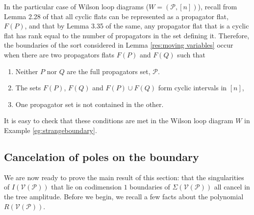 \documentclass[11pt]{article}
\newcommand{\drawWLD}[2]{

\pgfmathsetmacro{\n}{#1}
\pgfmathsetmacro{\radius}{#2}
\pgfmathsetmacro{\angle}{360/\n}
\draw (0,0) circle (\radius);
    \foreach \i in {1,2,...,\n} {
      \draw (\angle*\i:\radius) node {$\bullet$};
    }

}
\newcommand{\drawprop}[4]{
\pgfmathsetmacro{\r}{#1}
\pgfmathsetmacro{\bumpr}{#2}
\pgfmathsetmacro{\s}{#3}
\pgfmathsetmacro{\bumps}{#4}
\pgfmathsetmacro{\perturbe}{\angle/\n}
\begin{scope}
\draw[smallpropagator] (\angle*\r + \angle/2 + \bumpr*\perturbe:\radius) -- (\angle*\s + \angle/2 + \bumps*\perturbe:\radius);
\end{scope}
}
\newcommand{\drawnumbers}{
  \foreach \i in {1,2,...,\n} {
  \pgfmathsetmacro{\x}{\angle*\i}
  \draw (\x:\radius*1.25) node {\footnotesize \i};
}
}
\def\ba #1\ea{\begin{align} #1 \end{align}}
\def\bas #1\eas{\begin{align*} #1 \end{align*}}
\newcommand{\cP}{\mathcal{P}}
\newcommand{\cV}{\mathcal{V}}
\newcommand{\VP}{\cV(\cP)}
\theoremstyle{remark}
\theoremstyle{definition}
\begin{document}
In the particular case of Wilson loop diagrams ($W = (\cP, [n])$), recall from Lemma 2.28 of \cite{Wilsonloop} that all cyclic flats can be represented as a propagator flat, $F(P)$, and that by Lemma 3.35 of the same, any propagator flat that is a cyclic flat has rank equal to the number of propagators in the set defining it. Therefore, the boundaries of the sort considered in Lemma \ref{res:moving variables} occur when there are two propagators flats $F(P)$ and $F(Q)$ such that \begin{enumerate} \item Neither $P$ nor $Q$ are the full propagators set, $\cP$. \item The sets $F(P)$, $F(Q)$ and $F(P) \cup F(Q)$ form cyclic intervals in $[n]$, \item One propagator set is not contained in the other. \end{enumerate} It is easy to check that these conditions are met in the Wilson loop diagram $W$ in Example \ref{eg:strangeboundary}.


\subsection{Cancelation of poles on the boundary \label{sec:cancelation}}

We are now ready to prove the main result of this section: that the singularities of $I(\VP)$ that lie on codimension $1$ boundaries of $\Sigma(\VP)$ all cancel in the tree amplitude. Before we begin, we recall a few facts about the polynomial $R(\VP)$. %
\end{document}
